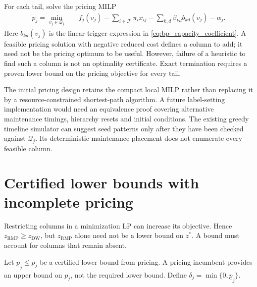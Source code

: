 For each tail, solve the pricing MILP
\begin{align}
 p_j=\min_{v_j\in\mathcal Q_j}\quad
 &f_j(v_j)-\sum_{i\in\mathcal F}\pi_i x_{ij}
          -\sum_{k,d}\beta_{kd}b_{kd}(v_j)-\alpha_j.
 \label{eq:bp_pricing_milp}
\end{align}
Here $b_{kd}(v_j)$ is the linear trigger expression in
\eqref{eq:bp_capacity_coefficient}. A feasible pricing solution with negative
reduced cost defines a column to add; it need not be the pricing optimum to
be useful. However, failure of a heuristic to find such a column is not an
optimality certificate. Exact termination requires a proven lower bound on
the pricing objective for every tail.

The initial pricing design retains the compact local MILP rather than
replacing it by a resource-constrained shortest-path algorithm. A future
label-setting implementation would need an equivalence proof covering
alternative maintenance timings, hierarchy resets and initial conditions.
The existing greedy timeline simulator can suggest seed patterns only after
they have been checked against $\mathcal Q_j$. Its deterministic maintenance
placement does not enumerate every feasible column.

\section{Certified lower bounds with incomplete pricing}
\label{sec:bp_certification}

Restricting columns in a minimization LP can increase its objective. Hence
$z_{\mathrm{RMP}}\ge z_{\mathrm{DW}}$, but $z_{\mathrm{RMP}}$ alone need not
be a lower bound on $z^*$. A bound must account for columns that remain absent.

Let $\underline p_j\le p_j$ be a certified lower bound from pricing. A pricing
incumbent provides an upper bound on $p_j$, not the required lower bound.
Define $\delta_j=\min\{0,\underline p_j\}$.

